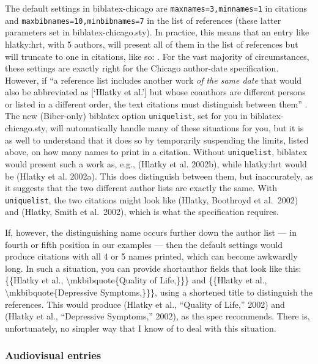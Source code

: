 \documentclass[a4paper,12pt]{report}
\begin{document}
The default settings in \textsf{biblatex-chicago} are
\texttt{maxnames=3,minnames=1} in citations and
\texttt{max\-bibnames=10,minbibnames=7} in the list of references
(these latter parameters set in \textsf{biblatex-chicago.sty}).  In
practice, this means that an entry like hlatky:hrt, with 5 authors,
will present all of them in the list of references but will truncate
to one in citations, like so: \autocite{hlatky:hrt}.  For the vast
majority of circumstances, these settings are exactly right for the
Chicago author-date specification.  However, if \enquote{a reference
  list includes another work \emph{of the same date} that would also
  be abbreviated as [\enquote{Hlatky et al.}] but whose coauthors are
  different persons or listed in a different order, the text citations
  must distinguish between them} \autocite[15.28]{chicago:manual}.
The new (\textsf{Biber}-only) \textsf{biblatex} option
\texttt{uniquelist}, set for you in \textsf{biblatex-chicago.sty},
will automatically handle many of these situations for you, but it is
as well to understand that it does so by temporarily suspending the
limits, listed above, on how many names to print in a citation.
Without \texttt{uniquelist}, \textsf{biblatex} would present such a
work as, e.g., (Hlatky et al. 2002b), while hlatky:hrt would be
(Hlatky et al. 2002a).  This does distinguish between them, but
inaccurately, as it suggests that the two different author lists are
exactly the same.  With \texttt{uniquelist}, the two citations might
look like (Hlatky, Boothroyd et al.\ 2002) and (Hlatky, Smith et al.\
2002), which is what the specification requires.

If, however, the distinguishing name occurs further down the author
list --- in fourth or fifth position in our examples --- then the
default settings would produce citations with all 4 or 5 names
printed, which can become awkwardly long.  In such a situation, you
can provide \textsf{shortauthor} fields that look like this:
\{\{Hlatky et al., \textbackslash mkbibquote\{Quality of Life,\}\}\}
and \{\{Hlatky et al., \textbackslash mkbibquote\{Depressive
Symptoms,\}\}\}, using a shortened title to distinguish the
references.  This would produce (Hlatky et al., \enquote{Quality of
  Life,} 2002) and (Hlatky et al., \enquote{Depressive Symptoms,}
2002), as the spec recommends.  There is, unfortunately, no simpler
way that I know of to deal with this situation.

\subsubsection*{Audiovisual entries}
\label{sec:audiovisual}
\end{document}
